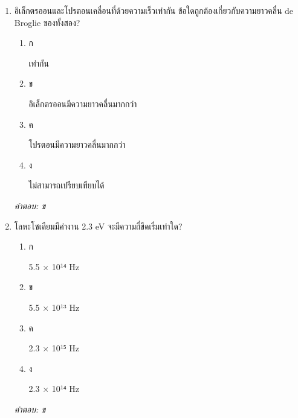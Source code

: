 \documentclass[12pt]{article}
\begin{document}
\begin{enumerate}[label=\arabic*., itemsep=0.5\baselineskip, topsep=0.5\baselineskip, leftmargin=*]
\item อิเล็กตรออนและโปรตอนเคลื่อนที่ด้วยความเร็วเท่ากัน ข้อใดถูกต้องเกี่ยวกับความยาวคลื่น de Broglie ของทั้งสอง?
\begin{enumerate}[label=\alph*)., itemsep=0.3\baselineskip, topsep=0.3\baselineskip]
\item ก\ 
\begin{minipage}[t]{0.9\linewidth}
\raggedright เท่ากัน
\end{minipage}
\item ข\ 
\begin{minipage}[t]{0.9\linewidth}
\raggedright อิเล็กตรออนมีความยาวคลื่นมากกว่า
\end{minipage}
\item ค\ 
\begin{minipage}[t]{0.9\linewidth}
\raggedright โปรตอนมีความยาวคลื่นมากกว่า
\end{minipage}
\item ง\ 
\begin{minipage}[t]{0.9\linewidth}
\raggedright ไม่สามารถเปรียบเทียบได้
\end{minipage}
\end{enumerate}
\vspace{-0.3\baselineskip}
\begin{small}
\textit{คำตอบ: ข}
\end{small}

\item โลหะโซเดียมมีค่างาน 2.3 eV จะมีความถี่ขีดเริ่มเท่าใด?
\begin{enumerate}[label=\alph*)., itemsep=0.3\baselineskip, topsep=0.3\baselineskip]
\item ก\ 
\begin{minipage}[t]{0.9\linewidth}
\raggedright 5.5 × 10¹⁴ Hz
\end{minipage}
\item ข\ 
\begin{minipage}[t]{0.9\linewidth}
\raggedright 5.5 × 10¹³ Hz
\end{minipage}
\item ค\ 
\begin{minipage}[t]{0.9\linewidth}
\raggedright 2.3 × 10¹⁵ Hz
\end{minipage}
\item ง\ 
\begin{minipage}[t]{0.9\linewidth}
\raggedright 2.3 × 10¹⁴ Hz
\end{minipage}
\end{enumerate}
\vspace{-0.3\baselineskip}
\begin{small}
\textit{คำตอบ: ข}
\end{small}


\end{enumerate}
\end{document}
